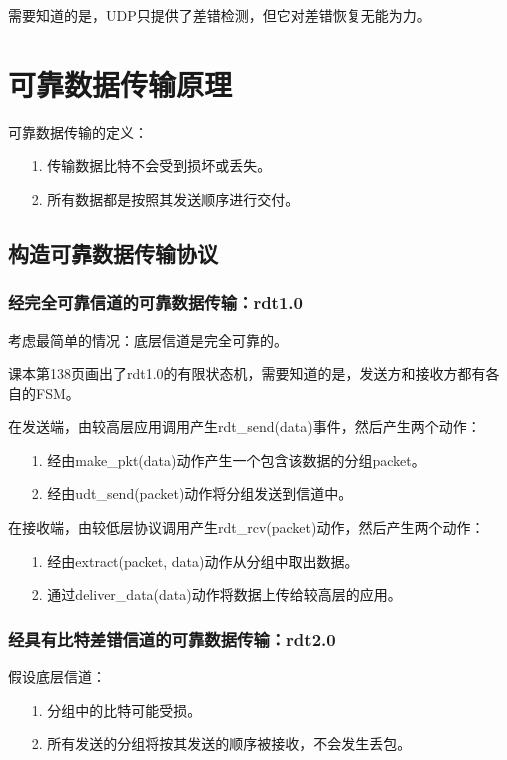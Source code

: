 \documentclass[a4paper,left=2.5cm,right=2.5cm,11pt]{article}
\begin{document}
	需要知道的是，UDP只提供了差错检测，但它对差错恢复无能为力。

\section{可靠数据传输原理}
	可靠数据传输的定义：
	\begin{itemize}
		\item[1.] 传输数据比特不会受到损坏或丢失。
		\item[2.] 所有数据都是按照其发送顺序进行交付。
	\end{itemize}

\subsection{构造可靠数据传输协议}
\subsubsection{经完全可靠信道的可靠数据传输：rdt1.0}
	考虑最简单的情况：底层信道是完全可靠的。\par

	课本第138页画出了rdt1.0的有限状态机，需要知道的是，发送方和接收方都有各自的FSM。\par

	在发送端，由较高层应用调用产生rdt\_send(data)事件，然后产生两个动作：
	\begin{itemize}
		\item[1.] 经由make\_pkt(data)动作产生一个包含该数据的分组packet。
		\item[2.] 经由udt\_send(packet)动作将分组发送到信道中。
	\end{itemize}

	在接收端，由较低层协议调用产生rdt\_rcv(packet)动作，然后产生两个动作：
	\begin{itemize}
		\item[1.] 经由extract(packet, data)动作从分组中取出数据。
		\item[2.] 通过deliver\_data(data)动作将数据上传给较高层的应用。
	\end{itemize}

\subsubsection{经具有比特差错信道的可靠数据传输：rdt2.0}
	假设底层信道：
	\begin{itemize}
		\item[1.] 分组中的比特可能受损。
		\item[2.] 所有发送的分组将按其发送的顺序被接收，不会发生丢包。
	\end{itemize}
\end{document}

